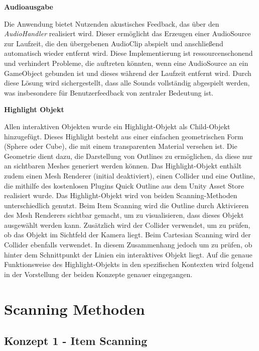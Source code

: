{\normalfont \bfseries Audioausgabe}

Die Anwendung bietet Nutzenden akustisches Feedback, das über den \textit{AudioHandler} realisiert wird. Dieser ermöglicht das Erzeugen einer AudioSource zur Laufzeit, die den übergebenen AudioClip abspielt und anschließend automatisch wieder entfernt wird. Diese Implementierung ist ressourcenschonend und verhindert Probleme, die auftreten könnten, wenn eine AudioSource an ein GameObject gebunden ist und dieses während der Laufzeit entfernt wird. Durch diese Lösung wird sichergestellt, dass alle Sounds vollständig abgespielt werden, was insbesondere für Benutzerfeedback von zentraler Bedeutung ist.

{\normalfont \bfseries Highlight Objekt}

Allen interaktiven Objekten wurde ein Highlight-Objekt als Child-Objekt hinzugefügt. Dieses Highlight besteht aus einer einfachen geometrischen Form (Sphere oder Cube), die mit einem transparenten Material versehen ist. Die Geometrie dient dazu, die Darstellung von Outlines zu ermöglichen, da diese nur an sichtbaren Meshes generiert werden können. Das Highlight-Objekt enthält zudem einen Mesh Renderer (initial deaktiviert), einen Collider und eine Outline, die mithilfe des kostenlosen Plugins Quick Outline \citep{chris_nolet_quick_2022} aus dem Unity Asset Store realisiert wurde.
Das Highlight-Objekt wird von beiden Scanning-Methoden unterschiedlich genutzt. Beim Item Scanning wird die Outline durch Aktivieren des Mesh Renderers sichtbar gemacht, um zu visualisieren, dass dieses Objekt ausgewählt werden kann. Zusätzlich wird der Collider verwendet, um zu prüfen, ob das Objekt im Sichtfeld der Kamera liegt. Beim Cartesian Scanning wird der Collider ebenfalls verwendet. In diesem Zusammenhang jedoch um zu prüfen, ob hinter dem Schnittpunkt der Linien ein interaktives Objekt liegt. Auf die genaue Funktionsweise des Highlight-Objekts in den spezifischen Kontexten wird folgend in der Vorstellung der beiden Konzepte genauer eingegangen. 


\section{Scanning Methoden}

\subsection{Konzept 1 - Item Scanning }

